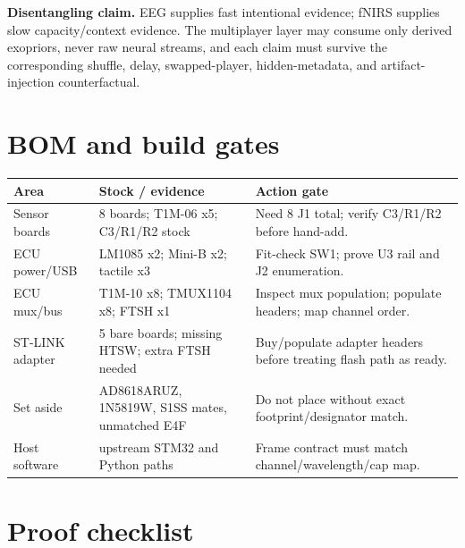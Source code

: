 \documentclass[10pt]{article}
\begin{document}
\textbf{Disentangling claim.} EEG supplies fast intentional evidence; fNIRS supplies
slow capacity/context evidence. The multiplayer layer may consume only derived
exopriors, never raw neural streams, and each claim must survive the corresponding
shuffle, delay, swapped-player, hidden-metadata, and artifact-injection
counterfactual.

\section{BOM and build gates}

\begin{center}\scriptsize
\begin{tabular}{|L{1.15in}|L{1.55in}|L{3.15in}|}
\hline
\textbf{Area} & \textbf{Stock / evidence} & \textbf{Action gate} \\
\hline
Sensor boards & 8 boards; T1M-06 x5; C3/R1/R2 stock & Need 8 J1 total; verify C3/R1/R2 before hand-add. \\
\hline
ECU power/USB & LM1085 x2; Mini-B x2; tactile x3 & Fit-check SW1; prove U3 rail and J2 enumeration. \\
\hline
ECU mux/bus & T1M-10 x8; TMUX1104 x8; FTSH x1 & Inspect mux population; populate headers; map channel order. \\
\hline
ST-LINK adapter & 5 bare boards; missing HTSW; extra FTSH needed & Buy/populate adapter headers before treating flash path as ready. \\
\hline
Set aside & AD8618ARUZ, 1N5819W, S1SS mates, unmatched E4F & Do not place without exact footprint/designator match. \\
\hline
Host software & upstream STM32 and Python paths & Frame contract must match channel/wavelength/cap map. \\
\hline
\end{tabular}
\end{center}

\section{Proof checklist}
\end{document}
